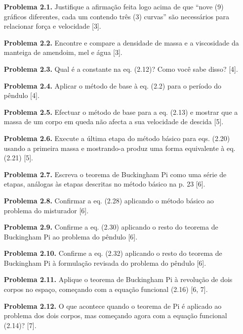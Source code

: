 \begin{enumerate}
    \item[\textbf{Problema 2.1.}] Justifique a afirmação feita logo acima de que ``nove (9) gráficos diferentes, cada um contendo três (3) curvas'' são necessários para relacionar força e velocidade [3].

    \item[\textbf{Problema 2.2.}] Encontre e compare a densidade de massa e a viscosidade da manteiga de amendoim, mel e água [3].

    \item[\textbf{Problema 2.3.}] Qual é a constante na eq. (2.12)? Como você sabe disso? [4].

    \item[\textbf{Problema 2.4.}] Aplicar o método de base à eq. (2.2) para o período do pêndulo [4].

    \item[\textbf{Problema 2.5.}] Efectuar o método de base para a eq. (2.13) e mostrar que a massa de um corpo em queda não afecta a sua velocidade de descida [5].

    \item[\textbf{Problema 2.6.}] Execute a última etapa do método básico para eqs. (2.20) usando a primeira massa e mostrando-a produz uma forma equivalente à eq. (2.21) [5].

    \item[\textbf{Problema 2.7.}] Escreva o teorema de Buckingham Pi como uma série de etapas, análogas às etapas descritas no método básico na p. 23 [6].

    \item[\textbf{Problema 2.8.}] Confirmar a eq. (2.28) aplicando o método básico ao problema do misturador [6].

    \item[\textbf{Problema 2.9.}] Confirme a eq. (2.30) aplicando o resto do teorema de Buckingham Pi ao problema do pêndulo [6].

    \item[\textbf{Problema 2.10.}] Confirme a eq. (2.32) aplicando o resto do teorema de Buckingham Pi à formulação revisada do problema do pêndulo [6].

    \item[\textbf{Problema 2.11.}] Aplique o teorema de Buckingham Pi à revolução de dois corpos no espaço, começando com a equação funcional (2.16) [6, 7].

    \item[\textbf{Problema 2.12.}] O que acontece quando o teorema de Pi é aplicado ao problema dos dois corpos, mas começando agora com a equação funcional (2.14)? [7].


\end{enumerate}
